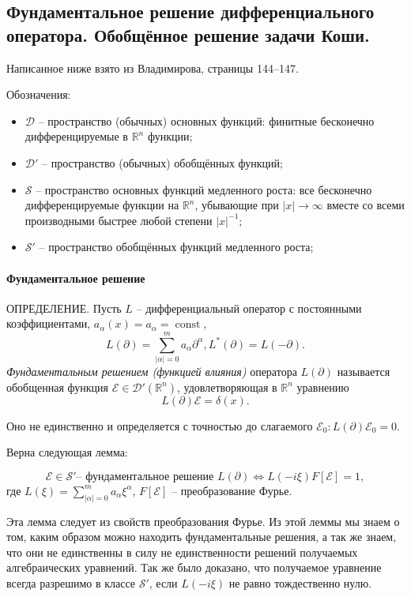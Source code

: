 \subsection{Фундаментальное решение дифференциального оператора. Обобщённое решение задачи Коши.}

Написанное ниже взято из Владимирова, страницы 144--147.

Обозначения:
\begin{itemize}
  \item $\mathcal{D}$ -- пространство (обычных) основных функций: финитные бесконечно
    дифференцируемые в $\mathbb{R}^n$ функции; 
  \item $\mathcal{D}'$ -- пространство (обычных) обобщённых функций;
  \item $\mathcal{S}$ -- пространство основных функций медленного роста: все бесконечно
    дифференцируемые функции на $\mathbb{R}^n$, убывающие при $|x| \to \infty$ вместе со
    всеми производными быстрее любой степени $|x|^{-1}$;
  \item $\mathcal{S}'$ -- пространство обобщённых функций медленного роста;
\end{itemize}

\paragraph{Фундаментальное решение}
ОПРЕДЕЛЕНИЕ. Пусть $L$ -- дифференциальный оператор с постоянными коэффициентами,
$a_\alpha (x) = a_\alpha = \operatorname{const}$,
\[
  L(\partial) = \sum_{|\alpha| = 0}^m a_\alpha \partial^\alpha, L^* (\partial) = L(-\partial).
\]
\emph{Фундаментальным решением (функцией влияния)} оператора $L(\partial)$ называется обобщенная
функция $\mathcal{E} \in \mathcal{D}' (\mathbb{R}^n)$, удовлетворяющая в $\mathbb{R}^n$ 
уравнению
\[
  L(\partial) \mathcal{E} = \delta (x).
\]

Оно не единственно и определяется с точностью до слагаемого
$\mathcal{E}_0: L(\partial) \mathcal{E}_0 = 0$.

Верна следующая лемма:
\begin{theorem}
  \[
    \mathcal{E} \in \mathcal{S}' \text{-- фундаментальное решение $L(\partial)$}
    \Leftrightarrow
    L(-i \xi) F[\mathcal{E}] = 1,
  \]
  где $L(\xi) = \sum_{|\alpha|=0}^m a_\alpha \xi^\alpha$, $F[\mathcal{E}]$ -- преобразование Фурье.
\end{theorem}

Эта лемма следует из свойств преобразования Фурье. Из этой леммы мы знаем о том, каким образом можно
находить фундаментальные решения, а так же знаем, что они не единственны в силу не единственности 
решений получаемых алгебраических уравнений. Так же было доказано, что получаемое уравнение всегда разрешимо в классе $\mathcal{S}'$, если $L(-i\xi)$ не равно тождественно нулю.


